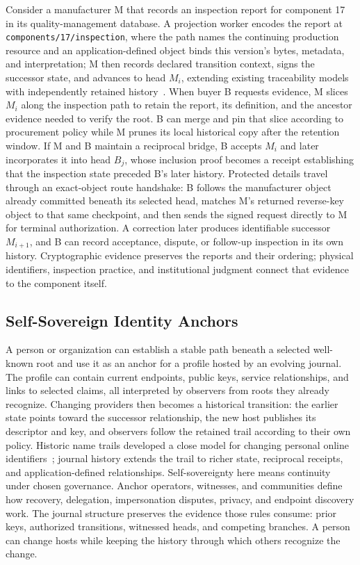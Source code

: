 Consider a manufacturer M that records an inspection report for component 17 in its quality-management database. A projection worker encodes the report at \texttt{components/17/\allowbreak inspection}, where the path names the continuing production resource and an application-defined object binds this version's bytes, metadata, and interpretation; M then records declared transition context, signs the successor state, and advances to head $M_i$, extending existing traceability models with independently retained history~\cite{Stouffer2022traceability,Hasan2009provenance}. When buyer B requests evidence, M slices $M_i$ along the inspection path to retain the report, its definition, and the ancestor evidence needed to verify the root. B can merge and pin that slice according to procurement policy while M prunes its local historical copy after the retention window. If M and B maintain a reciprocal bridge, B accepts $M_i$ and later incorporates it into head $B_j$, whose inclusion proof becomes a receipt establishing that the inspection state preceded B's later history. Protected details travel through an exact-object route handshake: B follows the manufacturer object already committed beneath its selected head, matches M's returned reverse-key object to that same checkpoint, and then sends the signed request directly to M for terminal authorization. A correction later produces identifiable successor $M_{i+1}$, and B can record acceptance, dispute, or follow-up inspection in its own history. Cryptographic evidence preserves the reports and their ordering; physical identifiers, inspection practice, and institutional judgment connect that evidence to the component itself.

\subsection{Self-Sovereign Identity Anchors}

A person or organization can establish a stable path beneath a selected well-known root and use it as an anchor for a profile hosted by an evolving journal. The profile can contain current endpoints, public keys, service relationships, and links to selected claims, all interpreted by observers from roots they already recognize. Changing providers then becomes a historical transition: the earlier state points toward the successor relationship, the new host publishes its descriptor and key, and observers follow the retained trail according to their own policy. Historic name trails developed a close model for changing personal online identifiers~\cite{Maniatis2003hints}; journal history extends the trail to richer state, reciprocal receipts, and application-defined relationships. Self-sovereignty here means continuity under chosen governance. Anchor operators, witnesses, and communities define how recovery, delegation, impersonation disputes, privacy, and endpoint discovery work. The journal structure preserves the evidence those rules consume: prior keys, authorized transitions, witnessed heads, and competing branches. A person can change hosts while keeping the history through which others recognize the change.

